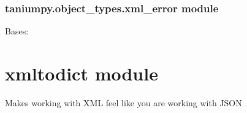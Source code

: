 \documentclass[letterpaper,10pt,english]{sphinxmanual}
\begin{document}
\subsubsection{taniumpy.object\_types.xml\_error module}
\label{taniumpy.object_types:module-taniumpy.object_types.xml_error}\label{taniumpy.object_types:taniumpy-object-types-xml-error-module}

\begin{fulllineitems}
\label{taniumpy.object_types:taniumpy.object_types.xml_error.XmlError}
Bases: {\hyperref[taniumpy.object_types:taniumpy.object_types.base.BaseType]{}}

\end{fulllineitems}



\section{xmltodict module}
\label{xmltodict:xmltodict-module}\label{xmltodict:module-xmltodict}\label{xmltodict::doc}
Makes working with XML feel like you are working with JSON
\end{document}
